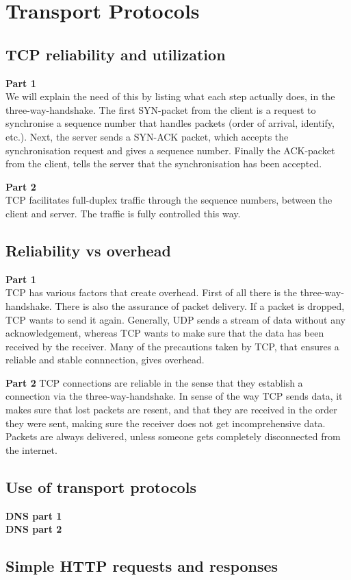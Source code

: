 \section{Transport Protocols}
\subsection{TCP reliability and utilization}
\textbf{Part 1} \\
We will explain the need of this by listing what each step actually does, in the
three-way-handshake. The first SYN-packet from the client is a request to
synchronise a sequence number that handles packets (order of arrival, identify,
etc.). Next, the server sends a SYN-ACK packet, which accepts the synchronisation
request and gives a sequence number. Finally the ACK-packet from the client,
tells the server that the synchronisation has been accepted.

\noindent \textbf{Part 2} \\
TCP facilitates full-duplex traffic through the sequence numbers, between the
client and server. The traffic is fully controlled this way.

\subsection{Reliability vs overhead}
\textbf{Part 1} \\
TCP has various factors that create overhead. First of all there is the
three-way-handshake. There is also the assurance of packet delivery. If a
packet is dropped, TCP wants to send it again. Generally, UDP sends a stream of
data without any acknowledgement, whereas TCP wants to make sure that the data
has been received by the receiver. Many of the precautions taken by TCP, that
ensures a reliable and stable connnection, gives overhead.

\noindent \textbf{Part 2}
TCP connections are reliable in the sense that they establish a connection via
the three-way-handshake. In sense of the way TCP sends data, it makes sure that
lost packets are resent, and that they are received in the order they were sent,
making sure the receiver does not get incomprehensive data. Packets are always
delivered, unless someone gets completely disconnected from the internet.

\subsection{Use of transport protocols}
\textbf{DNS part 1} \\

\noindent \textbf{DNS part 2} \\

\subsection*{Simple HTTP requests and responses}
